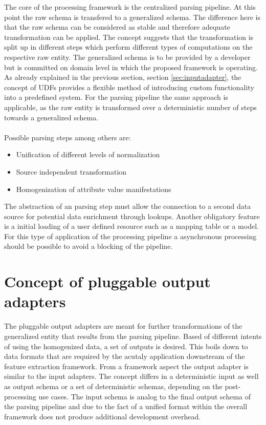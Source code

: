 The core of the processing framework is the centralized parsing pipeline. At this point the raw schema is transfered to a generalized schema. The difference here is that the raw schema can be considered as stable and therefore adequate transformation can be applied. The concept suggests that the transformation is split up in different steps which perform different types of computations on the respective raw entity. The generalized schema is to be provided by a developer but is committed on domain level in which the proposed framework is operating. As already explained in the previous section, section \ref{sec:inputadapter}, the concept of UDFs provides a flexible method of introducing custom functionality into a predefined system. For the parsing pipeline the same approach is applicable, as the raw entity is transformed over a deterministic number of steps towards a generalized schema. 
\\\\
Possible parsing steps among others are:
\begin{itemize}
\item Unification of different levels of normalization
\item Source independent transformation
\item Homogenization of attribute value manifestations
\end{itemize}

The abstraction of an parsing step must allow the connection to a second data source for potential data enrichment through lookups. Another obligatory feature is a initial loading of a user defined resource such as a mapping table or a model. For this type of application of the processing pipeline a asynchronous processing should be possible to avoid a blocking of the pipeline.

\section{Concept of pluggable output adapters\label{sec:componentsoutput}}

The pluggable output adapters are meant for further transformations of the generalized entity that results from the parsing pipeline. Based of different intents of using the homogenized data, a set of outputs is desired. This boils down to data formats that are required by the acutaly application downstream of the feature extraction framework. From a framework aspect the output adapter is similar to the input adapters. The concept differs in a deterministic input as well as output schema or a set of deterministic schemas, depending on the post-processing use cases. The input schema is analog to the final output schema of the parsing pipeline and due to the fact of a unified format within the overall framework does not produce additional development overhead. 

